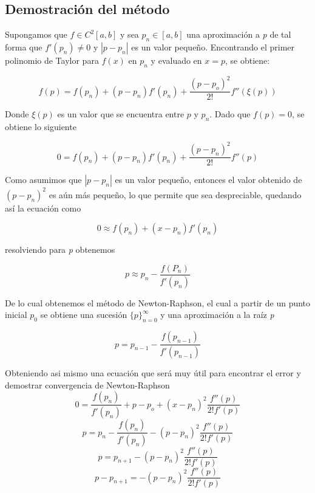 \subsection{Demostración del método}
Supongamos que $ f \in C^2[a,b] $ y sea $ p_n \in [a,b]$ una aproximación a \textit{p} de tal forma que $f'(p_n) \neq 0$ y $ | p - p_n | $ es un valor pequeño. Encontrando el primer polinomio de Taylor para $f(x)$ en $p_n$ y evaluado en $x = p$, se obtiene:

\begin{displaymath}
 f(p) = f(p_n) + (p-p_n)f'(p_n) + \frac{(p-p_o)^2}{2!}f''(\xi(p))
\end{displaymath}


\noindent Donde $\xi(p)$ es un valor que se encuentra entre $p$ y $p_n$. Dado que $f(p) = 0$, se obtiene lo siguiente

\begin{displaymath}
 0 = f(p_n) + (p-p_n)f'(p_n) + \frac{(p-p_n)^2}{2!}f''(p)
\end{displaymath}


Como asumimos que $ | p - p_n | $ es un valor pequeño, entonces el valor obtenido de $(p-p_n)^2$ es aún más pequeño, lo que permite que sea despreciable, quedando así la ecuación como

\begin{displaymath}
    0 \approx f(p_n) + (x-p_n)f'(p_n)
\end{displaymath}

resolviendo para \textit{p} obtenemos

\begin{displaymath}
    p \approx p_n - \frac{f(P_n)}{f'(p_n)}
\end{displaymath}

De lo cual obtenemos el método de Newton-Raphson, el cual a partir de un punto inicial $p_0$ se obtiene una sucesión $\{p\}^\infty_{n=0}$ y una aproximación a la raíz \textit{p}

\begin{equation}
    p = p_{n-1} - \frac{f(p_{n-1})}{f'(p_{n-1})}
\end{equation}

Obteniendo asi mismo una ecuación que será muy útil para encontrar el error y demostrar convergencia de Newton-Raphson
\begin{displaymath}
0 = \frac{f(p_n)}{f'(p_n)} + p-p_o +(x-p_n)^2 \frac{f''(p)}{2!f'(p)}
\end{displaymath}
\begin{displaymath}
p = p_n - \frac{f(p_n)}{f'(p_n)}  - (p-p_n)^2 \frac{f''(p)}{2!f'(p)}
\end{displaymath}
\begin{displaymath}
p = p_{n+1}  - (p-p_n)^2 \frac{f''(p)}{2!f'(p)}
\end{displaymath}
\begin{displaymath}
p - p_{n+1} =  - (p-p_n)^2 \frac{f''(p)}{2!f'(p)}
\end{displaymath}